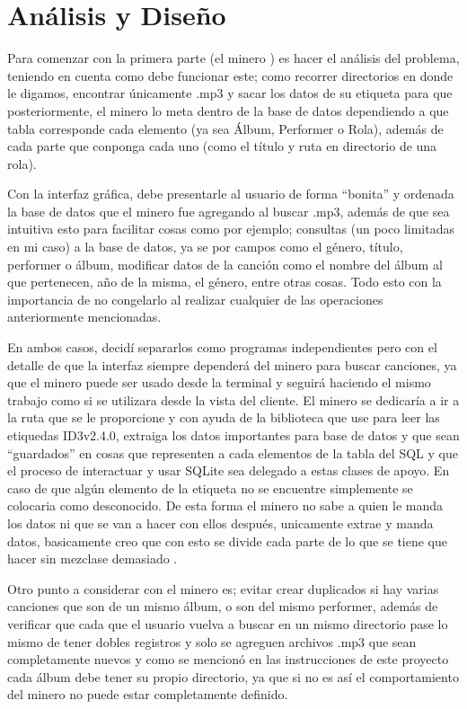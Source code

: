 \documentclass[12pt,letterpaper]{article}
\begin{document}
\newpage
\section{Análisis y Diseño}
Para comenzar con la primera parte (el minero ) es hacer el análisis del problema, teniendo en cuenta como debe funcionar este; como recorrer directorios en donde le digamos, encontrar únicamente .mp3 y sacar los datos de su etiqueta para que posteriormente, el minero lo meta dentro de la base de datos dependiendo a que tabla corresponde cada elemento (ya sea Álbum, Performer o Rola), además de cada parte que conponga cada uno (como el título y ruta en directorio de una rola).

Con la interfaz gráfica, debe presentarle al usuario de forma ``bonita'' y ordenada la base de datos que el minero fue agregando al buscar .mp3, además de que sea intuitiva esto para facilitar cosas como por ejemplo;
consultas (un poco limitadas en mi caso) a la base de datos, ya se por campos como el género, título, performer o álbum, modificar datos de la canción como el nombre del álbum al que pertenecen, año de la misma, el género, entre otras cosas. Todo esto con la importancia de no congelarlo al realizar cualquier de las operaciones anteriormente mencionadas.

En ambos casos, decidí separarlos como programas independientes pero con el detalle de que la interfaz siempre dependerá del minero para buscar canciones, ya que el minero puede ser usado desde la terminal y seguirá haciendo el mismo trabajo como si se utilizara desde la vista del cliente. El minero se dedicaría a ir a la ruta que se le proporcione y con ayuda de la biblioteca que use para leer las etiquedas ID3v2.4.0, extraiga los datos importantes para base de datos y que sean ``guardados'' en cosas que representen a cada elementos de la tabla del SQL y que el proceso de interactuar y usar SQLite sea delegado a estas clases de apoyo. En caso de que algún elemento de la etiqueta no se encuentre simplemente se colocaria como desconocido.  De esta forma el minero no sabe a quien le manda los datos ni que se van a hacer con ellos después, unicamente extrae y manda datos, basicamente creo que con esto se divide cada parte de lo que se tiene que hacer sin mezclase demasiado .

Otro punto a considerar con el minero es; evitar crear duplicados si hay varias canciones que son de un mismo álbum, o son del mismo performer, además de verificar que cada que el usuario vuelva a buscar en un mismo directorio pase lo mismo de tener dobles registros y solo se agreguen archivos .mp3 que sean completamente nuevos y como se mencionó en las instrucciones de este proyecto cada álbum debe tener su propio directorio, ya que si no es así el comportamiento del minero no puede estar completamente definido. 
\end{document}
